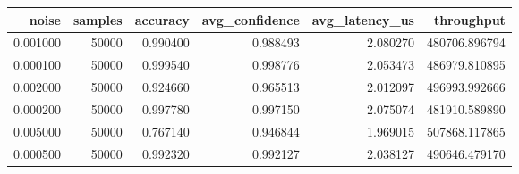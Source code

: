\begin{tabular}{rrrrrr}
\toprule
noise & samples & accuracy & avg_confidence & avg_latency_us & throughput \\
\midrule
0.001000 & 50000 & 0.990400 & 0.988493 & 2.080270 & 480706.896794 \\
0.000100 & 50000 & 0.999540 & 0.998776 & 2.053473 & 486979.810895 \\
0.002000 & 50000 & 0.924660 & 0.965513 & 2.012097 & 496993.992666 \\
0.000200 & 50000 & 0.997780 & 0.997150 & 2.075074 & 481910.589890 \\
0.005000 & 50000 & 0.767140 & 0.946844 & 1.969015 & 507868.117865 \\
0.000500 & 50000 & 0.992320 & 0.992127 & 2.038127 & 490646.479170 \\
\bottomrule
\end{tabular}
